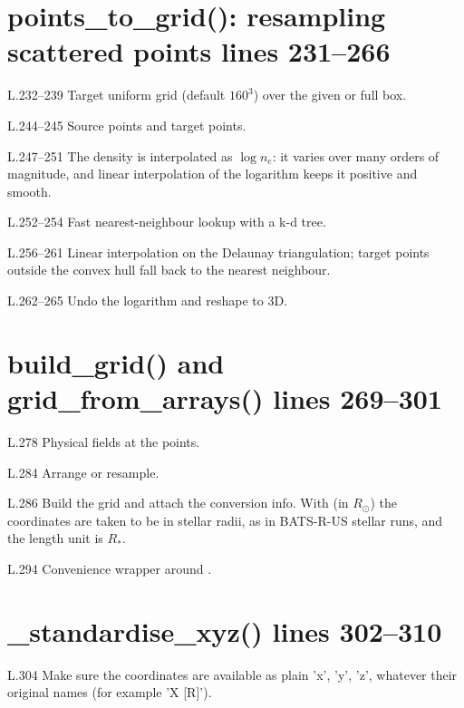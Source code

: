 \section*{\normalsize points\_to\_grid(): resampling scattered points \hfill{\small\mdseries\color{gray}lines 231--266}}

\begin{lines}
\item[L.232–239] Target uniform grid (default $160^3$) over the given or full box.
\item[L.244–245] Source points and target points.
\item[L.247–251] The density is interpolated as $\log n_e$: it varies over many orders of magnitude, and linear interpolation of the logarithm keeps it positive and smooth.
\item[L.252–254] Fast nearest-neighbour lookup with a k-d tree.
\item[L.256–261] Linear interpolation on the Delaunay triangulation; target points outside the convex hull fall back to the nearest neighbour.
\item[L.262–265] Undo the logarithm and reshape to 3D.
\end{lines}
\section*{\normalsize build\_grid() and grid\_from\_arrays() \hfill{\small\mdseries\color{gray}lines 269--301}}

\begin{lines}
\item[L.278] Physical fields at the points.
\item[L.284] Arrange or resample.
\item[L.286] Build the grid and attach the conversion info. With  (in $R_\odot$) the coordinates are taken to be in stellar radii, as in BATS-R-US stellar runs, and the length unit is $R_\ast$.
\item[L.294] Convenience wrapper around .
\end{lines}
\section*{\normalsize \_standardise\_xyz() \hfill{\small\mdseries\color{gray}lines 302--310}}

\begin{lines}
\item[L.304] Make sure the coordinates are available as plain 'x', 'y', 'z', whatever their original names (for example 'X [R]').
\end{lines}
